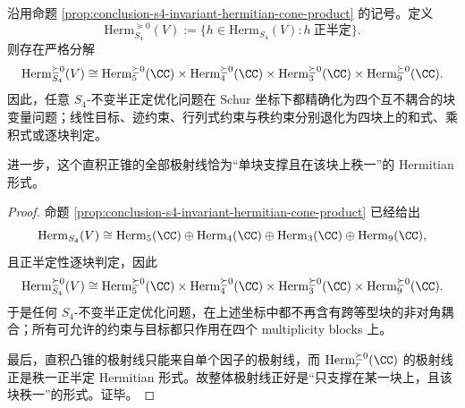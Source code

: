 \begin{theorem}\label{thm:conclusion-s4-hodge-four-block-psd-cone-decoupling}
沿用命题 \ref{prop:conclusion-s4-invariant-hermitian-cone-product} 的记号。定义
\[
\mathrm{Herm}^{\succeq 0}_{S_4}(V)
:=
\{h\in \mathrm{Herm}_{S_4}(V): h\ \text{正半定}\}.
\]
则存在严格分解
\[
\mathrm{Herm}^{\succeq 0}_{S_4}(V)
\cong
\mathrm{Herm}^{\succeq 0}_5(\CC)\times
\mathrm{Herm}^{\succeq 0}_4(\CC)\times
\mathrm{Herm}^{\succeq 0}_3(\CC)\times
\mathrm{Herm}^{\succeq 0}_9(\CC).
\]
因此，任意 \(S_4\)-不变半正定优化问题在 Schur 坐标下都精确化为四个互不耦合的块变量问题；线性目标、迹约束、行列式约束与秩约束分别退化为四块上的和式、乘积式或逐块判定。

进一步，这个直积正锥的全部极射线恰为“单块支撑且在该块上秩一”的 Hermitian 形式。
\end{theorem}
\begin{proof}
命题 \ref{prop:conclusion-s4-invariant-hermitian-cone-product} 已经给出
\[
\mathrm{Herm}_{S_4}(V)
\cong
\mathrm{Herm}_5(\CC)\oplus
\mathrm{Herm}_4(\CC)\oplus
\mathrm{Herm}_3(\CC)\oplus
\mathrm{Herm}_9(\CC),
\]
且正半定性逐块判定，因此
\[
\mathrm{Herm}^{\succeq 0}_{S_4}(V)
\cong
\mathrm{Herm}^{\succeq 0}_5(\CC)\times
\mathrm{Herm}^{\succeq 0}_4(\CC)\times
\mathrm{Herm}^{\succeq 0}_3(\CC)\times
\mathrm{Herm}^{\succeq 0}_9(\CC).
\]
于是任何 \(S_4\)-不变半正定优化问题，在上述坐标中都不再含有跨等型块的非对角耦合；所有可允许的约束与目标都只作用在四个 multiplicity blocks 上。

最后，直积凸锥的极射线只能来自单个因子的极射线，而 \(\mathrm{Herm}^{\succeq 0}_r(\CC)\) 的极射线正是秩一正半定 Hermitian 形式。故整体极射线正好是“只支撑在某一块上，且该块秩一”的形式。证毕。
\end{proof}

